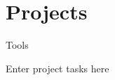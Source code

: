 
\section{Projects}
 {Tools}
\begin{entryitems}
    \item{Enter project tasks here}
\end{entryitems}


